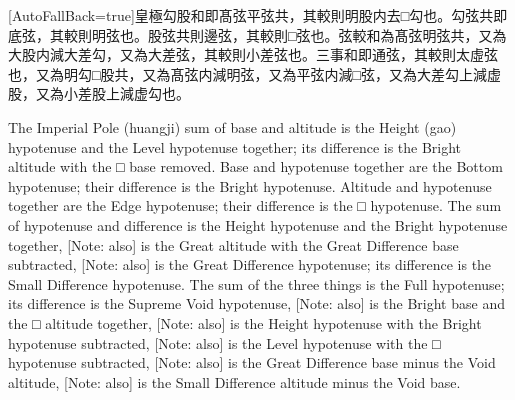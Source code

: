 \documentclass[11pt]{article}
\newcommand{\zhsmall}{\footnotesize\color{black!70}}
\newcommand{\unitlabel}[1]{\marginpar{\raggedleft\tiny\color{gray}#1}}
\newenvironment{unitzh}{\par\CJKfontspec{Noto Serif CJK SC}[AutoFallBack=true]\large\linespread{1.25}\selectfont}{\par}
\newenvironment{uniten}{\par\small\color{black!85}}{\par\medskip}
\begin{document}
\begin{unitzh}\unitlabel{ceyuan-003.4}皇極勾股和即髙弦平弦共，其較則明股内去□勾也。勾弦共即底弦，其較則明弦也。股弦共則邊弦，其較則□弦也。弦較和為髙弦明弦共，{\zhsmall 又}為大股内減大差勾，{\zhsmall 又}為大差弦，其較則小差弦也。三事和即通弦，其較則太虛弦也，{\zhsmall 又}為明勾□股共，{\zhsmall 又}為髙弦内減明弦，{\zhsmall 又}為平弦内減□弦，{\zhsmall 又}為大差勾上減虚股，{\zhsmall 又}為小差股上減虚勾也。\end{unitzh}
\begin{uniten}The Imperial Pole (huangji) sum of base and altitude is the Height (gao) hypotenuse and the Level hypotenuse together; its difference is the Bright altitude with the □ base removed. Base and hypotenuse together are the Bottom hypotenuse; their difference is the Bright hypotenuse. Altitude and hypotenuse together are the Edge hypotenuse; their difference is the □ hypotenuse. The sum of hypotenuse and difference is the Height hypotenuse and the Bright hypotenuse together, [Note: also] is the Great altitude with the Great Difference base subtracted, [Note: also] is the Great Difference hypotenuse; its difference is the Small Difference hypotenuse. The sum of the three things is the Full hypotenuse; its difference is the Supreme Void hypotenuse, [Note: also] is the Bright base and the □ altitude together, [Note: also] is the Height hypotenuse with the Bright hypotenuse subtracted, [Note: also] is the Level hypotenuse with the □ hypotenuse subtracted, [Note: also] is the Great Difference base minus the Void altitude, [Note: also] is the Small Difference altitude minus the Void base.\end{uniten}
\end{document}
